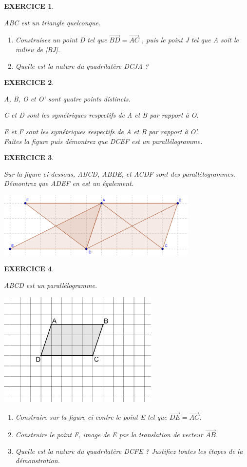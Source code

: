 \documentclass[a4paper]{article}   %
\renewcommand{\(}{\left(}
\renewcommand{\)}{\right)}
\newtheorem{EXO}{\large EXERCICE }
\newenvironment{EX}   { \setcounter{ques}{0} \begin{EXO} \hrulefill ~\vspace{0.3cm}

\normalfont}    {\end{EXO} \medskip}
\def\v{\overrightarrow}	%
\begin{document}
\begin{EX} 
ABC est un triangle quelconque.
\begin{enumerate}
\item  Construisez un point D tel que $\v{BD} = \v{AC}$ , puis le point J tel que A soit le milieu de [BJ].
\item Quelle est la nature du quadrilatère DCJA ?
\end{enumerate}
\end{EX}

\begin{EX} 
A, B, O et O’ sont quatre points distincts. 

C et D sont les symétriques respectifs de A et B par rapport à O. 

E et F sont les symétriques respectifs de A et B par rapport à O’.
~~~\\
Faites la figure puis démontrez que DCEF est un parallélogramme. 
\end{EX}

\begin{EX} 
Sur la figure ci-dessous, ABCD, ABDE, et ACDF sont des parallélogrammes. \\
Démontrez que ADEF en est un également.
\begin{center}
\includegraphics[width=10cm]{8ex5.png}
\end{center}\end{EX}

\begin{EX} 
ABCD est un parallélogramme.
\begin{center}
\includegraphics[width=8cm]{8ex6.png}
\end{center}
\begin{enumerate}
\item  Construire sur la figure ci-contre le point E tel que $\v{DE}=\v{AC}$.
\item Construire le point F, image de E par la translation de vecteur $\v{AB}$.
\item Quelle est la nature du quadrilatère DCFE ? Justifiez toutes les étapes de la démonstration.\end{enumerate}

\end{EX}
\end{document}

